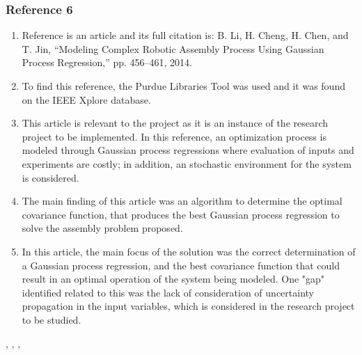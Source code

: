 \documentclass{journal}
\begin{document}
\subsubsection{Reference 6} 
\begin{enumerate}
	\item Reference \cite{Li2014} is an article and its full citation is: B. Li, H. Cheng, H. Chen, and T. Jin, “Modeling Complex Robotic Assembly Process Using Gaussian Process Regression,” pp. 456–461, 2014.
	\item To find this reference, the Purdue Libraries Tool was used and it was found on the IEEE Xplore database.
	\item This article is relevant to the project as it is an instance of the research project to be implemented. In this reference, an optimization process is modeled through Gaussian process regressions where evaluation of inputs and experiments are costly; in addition, an stochastic environment for the system is considered.
	\item The main finding of this article was an algorithm to determine the optimal covariance function, that produces the best Gaussian process regression to solve the assembly problem proposed.  
	\item In this article, the main focus of the solution was the correct determination of a Gaussian process regression, and the best covariance function that could result in an optimal operation of the system being modeled. One "gap" identified related to this was the lack of consideration of uncertainty propagation in the input variables, which is considered in the research project to be studied.
\end{enumerate}




\cite{Pandita2016}, \cite{Costa2006}, \cite{Guo2007}, \cite{Huang2006}
\end{document}
